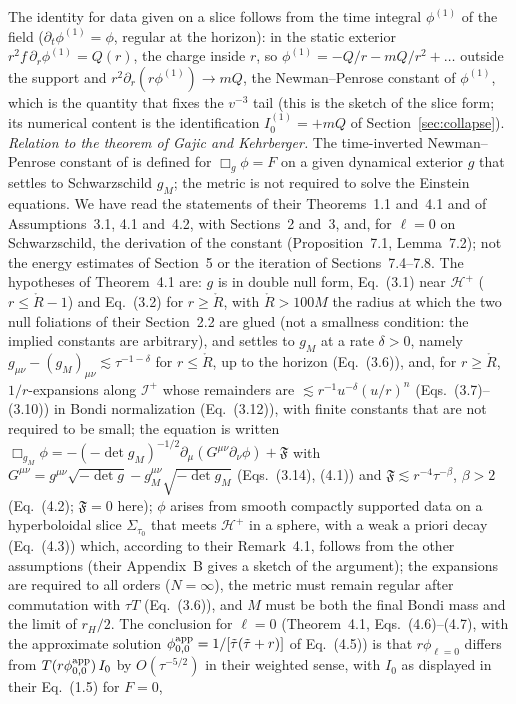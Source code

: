 \documentclass[11pt]{article}
\begin{document}
The identity for data given on a slice follows from the time integral $\phi^{(1)}$ of the field ($\partial_t\phi^{(1)}=\phi$, regular at the horizon): in the static exterior $r^{2}f\,\partial_r\phi^{(1)}=Q(r)$, the charge inside $r$, so $\phi^{(1)}=-Q/r-mQ/r^{2}+\dots$ outside the support and $r^{2}\partial_r(r\phi^{(1)})\to mQ$, the Newman--Penrose constant of $\phi^{(1)}$, which is the quantity that fixes the $v^{-3}$ tail (this is the sketch of the slice form; its numerical content is the identification $I_0^{(1)}=+mQ$ of Section~\ref{sec:collapse}). \emph{Relation to the theorem of Gajic and Kehrberger.} The time-inverted Newman--Penrose constant of \citet{GajicKehrberger2025} is defined for $\Box_g\phi=F$ on a given dynamical exterior $g$ that settles to Schwarzschild $g_M$; the metric is not required to solve the Einstein equations. We have read the statements of their Theorems~1.1 and~4.1 and of Assumptions~3.1, 4.1 and~4.2, with Sections~2 and~3, and, for $\ell=0$ on Schwarzschild, the derivation of the constant (Proposition~7.1, Lemma~7.2); not the energy estimates of Section~5 or the iteration of Sections~7.4--7.8. The hypotheses of Theorem~4.1 are: $g$ is in double null form, Eq.~(3.1) near $\mathcal H^{+}$ ($r\le\mathring R-1$) and Eq.~(3.2) for $r\ge\mathring R$, with $\mathring R>100M$ the radius at which the two null foliations of their Section~2.2 are glued (not a smallness condition: the implied constants are arbitrary), and settles to $g_M$ at a rate $\delta>0$, namely $g_{\mu\nu}-(g_M)_{\mu\nu}\lesssim\tau^{-1-\delta}$ for $r\le\mathring R$, up to the horizon (Eq.~(3.6)), and, for $r\ge\mathring R$, $1/r$-expansions along $\mathcal I^{+}$ whose remainders are $\lesssim r^{-1}u^{-\delta}(u/r)^n$ (Eqs.~(3.7)--(3.10)) in Bondi normalization (Eq.~(3.12)), with finite constants that are not required to be small; the equation is written $\Box_{g_M}\phi=-(-\det g_M)^{-1/2}\partial_\mu(G^{\mu\nu}\partial_\nu\phi)+\mathfrak F$ with $G^{\mu\nu}=g^{\mu\nu}\sqrt{-\det g}-g_M^{\mu\nu}\sqrt{-\det g_M}$ (Eqs.~(3.14), (4.1)) and $\mathfrak F\lesssim r^{-4}\tau^{-\beta}$, $\beta>2$ (Eq.~(4.2); $\mathfrak F=0$ here); $\phi$ arises from smooth compactly supported data on a hyperboloidal slice $\Sigma_{\tau_0}$ that meets $\mathcal H^{+}$ in a sphere, with a weak a priori decay (Eq.~(4.3)) which, according to their Remark~4.1, follows from the other assumptions (their Appendix~B gives a sketch of the argument); the expansions are required to all orders ($N=\infty$), the metric must remain regular after commutation with $\tau T$ (Eq.~(3.6)), and $M$ must be both the final Bondi mass and the limit of $r_H/2$. The conclusion for $\ell=0$ (Theorem~4.1, Eqs.~(4.6)--(4.7), with the approximate solution $\phi^{\rm app}_{0,0}=1/[\tilde\tau(\tilde\tau+r)]$ of Eq.~(4.5)) is that $r\phi_{\ell=0}$ differs from $T(r\phi^{\rm app}_{0,0})\,I_0$ by $O(\tau^{-5/2})$ in their weighted sense, with $I_0$ as displayed in their Eq.~(1.5) for $F=0$,
\end{document}
